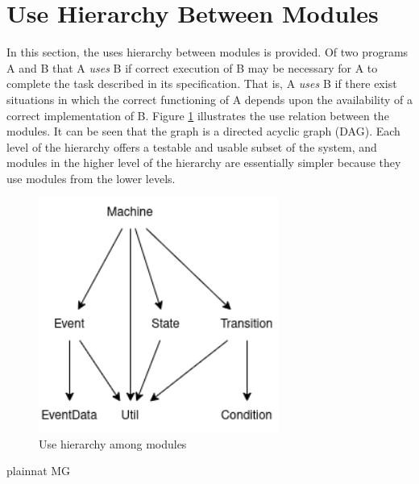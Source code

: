 \documentclass[12pt, titlepage]{article}
\begin{document}
\color{red}
\section{Use Hierarchy Between Modules} \label{SecUse}

In this section, the uses hierarchy between modules is
provided. Of two programs A and B that A {\em uses} B if
correct execution of B may be necessary for A to complete the task described in
its specification. That is, A {\em uses} B if there exist situations in which
the correct functioning of A depends upon the availability of a correct
implementation of B.  Figure \ref{FigUH} illustrates the use relation between
the modules. It can be seen that the graph is a directed acyclic graph
(DAG). Each level of the hierarchy offers a testable and usable subset of the
system, and modules in the higher level of the hierarchy are essentially simpler
because they use modules from the lower levels.

\begin{figure}[H]
  \centering
  \includegraphics[width=0.7\textwidth]{hierarchy.png}
  \caption{Use hierarchy among modules}
  \label{FigUH}
\end{figure}

\color{black}

 {plainnat}
 {MG}
\end{document}
